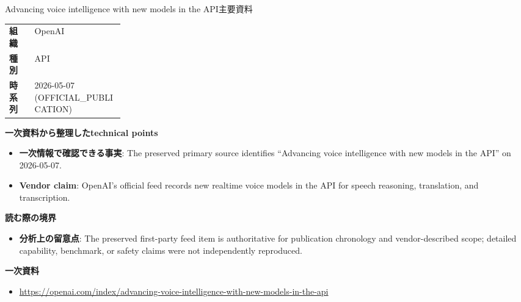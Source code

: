 \begin{technicalnote}{Advancing voice intelligence with new models in the API}{主要資料}
\begin{tabularx}{\linewidth}{@{}>{\bfseries}p{0.22\linewidth}X@{}}
組織 & OpenAI \\
種別 & API \\
時系列 & 2026-05-07 (OFFICIAL\_PUBLICATION) \\
\end{tabularx}
\smallskip
{\bfseries 一次資料から整理したtechnical points}
\begin{itemize}[leftmargin=1.5em,itemsep=0.35em]
\item \textbf{一次情報で確認できる事実}: The preserved primary source identifies “Advancing voice intelligence with new models in the API” on 2026-05-07.
\item \textbf{Vendor claim}: OpenAI's official feed records new realtime voice models in the API for speech reasoning, translation, and transcription.
\end{itemize}
{\bfseries 読む際の境界}
\begin{itemize}[leftmargin=1.5em,itemsep=0.35em]
\item \textbf{分析上の留意点}: The preserved first-party feed item is authoritative for publication chronology and vendor-described scope; detailed capability, benchmark, or safety claims were not independently reproduced.
\end{itemize}
{\bfseries 一次資料}
\begingroup\sloppy
\begin{itemize}[leftmargin=1.5em,itemsep=0.25em]
\item {\scriptsize\url{https://openai.com/index/advancing-voice-intelligence-with-new-models-in-the-api}}
\end{itemize}
\endgroup
\end{technicalnote}
\medskip

